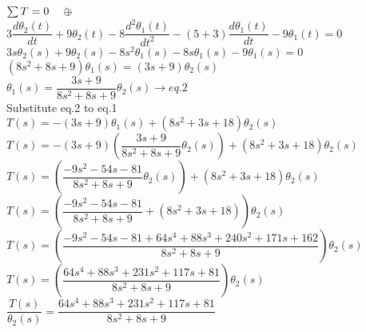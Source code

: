 \documentclass[11pt,letterpaper]{article}
\begin{document}
\begin{center}
	
					$\sum T = 0 \quad \circlearrowright \hspace{-0.8em} $+$  $ \\
	
					$3\dfrac{d\theta_2(t)}{dt}+9\theta_2(t)-8\dfrac{d^2\theta_1(t)}{dt^2}-(5+3)\dfrac{d\theta_1(t)}{dt}-9\theta_1(t)=0$\\
	
					$3s\theta_2(s)+9\theta_2(s)-8s^2\theta_1(s)-8s\theta_1(s)-9\theta_1(s)=0$\\
	
					$(8s^2+8s+9)\theta_1(s)=(3s+9)\theta_2(s)$\\
	
					$\theta_1(s)=\dfrac{3s+9}{8s^2+8s+9}\theta_2(s)  \rightarrow eq.2$\\

					Substitute eq.2 to eq.1\\

					$T(s)=-(3s+9)\theta_1(s)+(8s^2+3s+18)\theta_2(s)$\\

					$T(s)=-(3s+9)\left(\dfrac{3s+9}{8s^2+8s+9}\theta_2(s)\right)+(8s^2+3s+18)\theta_2(s)$\\

					$T(s)=\left(\dfrac{-9s^2-54s-81}{8s^2+8s+9}\theta_2(s)\right)+(8s^2+3s+18)\theta_2(s)$\\

					$T(s)=\left(\dfrac{-9s^2-54s-81}{8s^2+8s+9}+(8s^2+3s+18)\right)\theta_2(s)$\\

					$T(s)=\left(\dfrac{-9s^2-54s-81+64s^4+88s^3+240s^2+171s+162}{8s^2+8s+9}\right)\theta_2(s)$\\

					$T(s)=\left(\dfrac{64s^4+88s^3+231s^2+117s+81}{8s^2+8s+9}\right)\theta_2(s)$\\

					$\dfrac{T(s)}{\theta_2(s)}=\dfrac{64s^4+88s^3+231s^2+117s+81}{8s^2+8s+9}$\\


					
\end{center}
\end{document}
